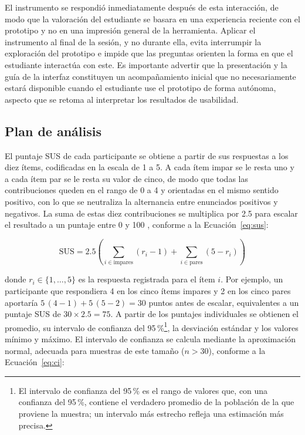 El instrumento se respondió inmediatamente después de esta interacción, de modo que la valoración del estudiante se basara en una experiencia reciente con el prototipo y no en una impresión general de la herramienta. Aplicar el instrumento al final de la sesión, y no durante ella, evita interrumpir la exploración del prototipo e impide que las preguntas orienten la forma en que el estudiante interactúa con este. Es importante advertir que la presentación y la guía de la interfaz constituyen un acompañamiento inicial que no necesariamente estará disponible cuando el estudiante use el prototipo de forma autónoma, aspecto que se retoma al interpretar los resultados de usabilidad.

\subsection{Plan de análisis}

El puntaje SUS de cada participante se obtiene a partir de sus respuestas a los diez ítems, codificadas en la escala de 1 a 5. A cada ítem impar se le resta uno y a cada ítem par se le resta su valor de cinco, de modo que todas las contribuciones queden en el rango de 0 a 4 y orientadas en el mismo sentido positivo, con lo que se neutraliza la alternancia entre enunciados positivos y negativos. La suma de estas diez contribuciones se multiplica por 2.5 para escalar el resultado a un puntaje entre 0 y 100 \cite{brooke1996sus}, conforme a la Ecuación~\ref{eq:sus}:

\begin{equation}
  \mathrm{SUS} = 2.5 \left( \sum_{i \in \text{impares}} (r_i - 1) + \sum_{i \in \text{pares}} (5 - r_i) \right)
  \label{eq:sus}
\end{equation}

donde $r_i \in \{1, \dots, 5\}$ es la respuesta registrada para el ítem $i$. Por ejemplo, un participante que respondiera 4 en los cinco ítems impares y 2 en los cinco pares aportaría $5\,(4-1) + 5\,(5-2) = 30$ puntos antes de escalar, equivalentes a un puntaje SUS de $30 \times 2.5 = 75$. A partir de los puntajes individuales se obtienen el promedio, su intervalo de confianza del 95\,\%\footnote{El intervalo de confianza del 95\,\% es el rango de valores que, con una confianza del 95\,\%, contiene el verdadero promedio de la población de la que proviene la muestra; un intervalo más estrecho refleja una estimación más precisa.}, la desviación estándar y los valores mínimo y máximo. El intervalo de confianza se calcula mediante la aproximación normal, adecuada para muestras de este tamaño ($n > 30$), conforme a la Ecuación~\ref{eq:ci}:

